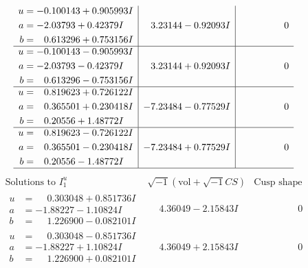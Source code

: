 \documentclass[1p]{elsarticle_modified}
\theoremstyle{definition}
\newcommand{\I}{\sqrt{-1}}
\begin{document}
$$\begin{array}{c|c|c}
\begin{aligned}
u &= -0.100143 + 0.905993 I \\
a &= -2.03793 + 0.42379 I \\
b &= \phantom{-}0.613296 + 0.753156 I\end{aligned}
 & \phantom{-}3.23144 - 0.92093 I & \phantom{-0.000000 } 0 \\ \hline\begin{aligned}
u &= -0.100143 - 0.905993 I \\
a &= -2.03793 - 0.42379 I \\
b &= \phantom{-}0.613296 - 0.753156 I\end{aligned}
 & \phantom{-}3.23144 + 0.92093 I & \phantom{-0.000000 } 0 \\ \hline\begin{aligned}
u &= \phantom{-}0.819623 + 0.726122 I \\
a &= \phantom{-}0.365501 + 0.230418 I \\
b &= \phantom{-}0.20556 + 1.48772 I\end{aligned}
 & -7.23484 - 0.77529 I & \phantom{-0.000000 } 0 \\ \hline\begin{aligned}
u &= \phantom{-}0.819623 - 0.726122 I \\
a &= \phantom{-}0.365501 - 0.230418 I \\
b &= \phantom{-}0.20556 - 1.48772 I\end{aligned}
 & -7.23484 + 0.77529 I & \phantom{-0.000000 } 0\\
 \hline 
 \end{array}$$\newpage$$\begin{array}{c|c|c}  
\text{Solutions to }I^u_{1}& \I (\text{vol} + \sqrt{-1}CS) & \text{Cusp shape}\\
 \hline 
\begin{aligned}
u &= \phantom{-}0.303048 + 0.851736 I \\
a &= -1.88227 - 1.10824 I \\
b &= \phantom{-}1.226900 - 0.082101 I\end{aligned}
 & \phantom{-}4.36049 - 2.15843 I & \phantom{-0.000000 } 0 \\ \hline\begin{aligned}
u &= \phantom{-}0.303048 - 0.851736 I \\
a &= -1.88227 + 1.10824 I \\
b &= \phantom{-}1.226900 + 0.082101 I\end{aligned}
 & \phantom{-}4.36049 + 2.15843 I & \phantom{-0.000000 } 0 \\ \hline\begin{aligned}

\end{aligned}
\end{array}$$
\end{document}
